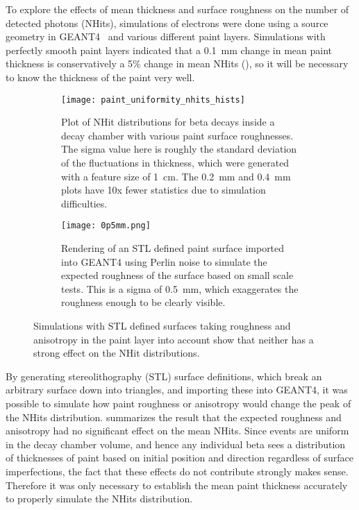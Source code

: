To explore the effects of mean thickness and surface roughness on the number of detected photons (NHits), simulations of \Li electrons were done using a source geometry in GEANT4~\cite{geant4} and various different paint layers. Simulations with perfectly smooth paint layers indicated that a 0.1~mm change in mean paint thickness is conservatively a 5\% change in mean NHits (), so it will be necessary to know the thickness of the paint very well. 

\begin{figure}[h!]
\begin{subfigure}{.53\textwidth}
  \texttt{[image: paint\_uniformity\_nhits\_hists]}
  \caption{Plot of NHit distributions for \Li beta decays inside a decay chamber with various paint surface roughnesses. The sigma value here is roughly the standard deviation of the fluctuations in thickness, which were generated with a feature size of 1~cm. The 0.2~mm and 0.4~mm plots have 10x fewer statistics due to simulation difficulties.}
  \label{fig:simulations}
\end{subfigure}
\hspace{0.5cm}
\begin{subfigure}{.38\textwidth}
  \centering
  \texttt{[image: 0p5mm.png]}
  \caption{Rendering of an STL defined paint surface imported into GEANT4 using Perlin noise to simulate the expected roughness of the surface based on small scale tests. This is a sigma of 0.5~mm, which exaggerates the roughness enough to be clearly visible.}
  \label{fig:rough_sphere}
\end{subfigure}
\caption{Simulations with STL defined surfaces taking roughness and anisotropy in the paint layer into account show that neither has a strong effect on the NHit distributions.}
\label{fig:stltests}
\end{figure}

By generating stereolithography (STL) surface definitions, which break an arbitrary surface down into triangles, and importing these into GEANT4, it was possible to simulate how paint roughness or anisotropy would change the peak of the NHits distribution. 
 summarizes the result that the expected roughness and anisotropy had no significant effect on the mean NHits. 
Since events are uniform in the decay chamber volume, and hence any individual beta sees a distribution of thicknesses of paint based on initial position and direction regardless of surface imperfections, the fact that these effects do not contribute strongly makes sense. 
Therefore it was only necessary to establish the mean paint thickness accurately to properly simulate the NHits distribution.

